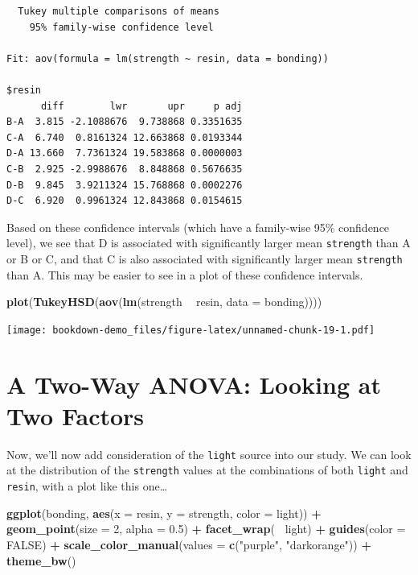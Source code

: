 \documentclass[]{book}
\newenvironment{Shaded}{\begin{snugshade}}{\end{snugshade}}
\newcommand{\KeywordTok}[1]{\textcolor[rgb]{0.13,0.29,0.53}{\textbf{#1}}}
\newcommand{\DataTypeTok}[1]{\textcolor[rgb]{0.13,0.29,0.53}{#1}}
\newcommand{\DecValTok}[1]{\textcolor[rgb]{0.00,0.00,0.81}{#1}}
\newcommand{\FloatTok}[1]{\textcolor[rgb]{0.00,0.00,0.81}{#1}}
\newcommand{\StringTok}[1]{\textcolor[rgb]{0.31,0.60,0.02}{#1}}
\newcommand{\OtherTok}[1]{\textcolor[rgb]{0.56,0.35,0.01}{#1}}
\newcommand{\OperatorTok}[1]{\textcolor[rgb]{0.81,0.36,0.00}{\textbf{#1}}}
\newcommand{\NormalTok}[1]{#1}
\theoremstyle{definition}
\theoremstyle{definition}
\theoremstyle{definition}
\theoremstyle{remark}
\begin{document}
\begin{verbatim}
  Tukey multiple comparisons of means
    95% family-wise confidence level

Fit: aov(formula = lm(strength ~ resin, data = bonding))

$resin
      diff        lwr       upr     p adj
B-A  3.815 -2.1088676  9.738868 0.3351635
C-A  6.740  0.8161324 12.663868 0.0193344
D-A 13.660  7.7361324 19.583868 0.0000003
C-B  2.925 -2.9988676  8.848868 0.5676635
D-B  9.845  3.9211324 15.768868 0.0002276
D-C  6.920  0.9961324 12.843868 0.0154615
\end{verbatim}

Based on these confidence intervals (which have a family-wise 95\%
confidence level), we see that D is associated with significantly larger
mean \texttt{strength} than A or B or C, and that C is also associated
with significantly larger mean \texttt{strength} than A. This may be
easier to see in a plot of these confidence intervals.

\begin{Shaded}
\begin{Highlighting}[]
\KeywordTok{plot}\NormalTok{(}\KeywordTok{TukeyHSD}\NormalTok{(}\KeywordTok{aov}\NormalTok{(}\KeywordTok{lm}\NormalTok{(strength }\OperatorTok{~}\StringTok{ }\NormalTok{resin, }\DataTypeTok{data =}\NormalTok{ bonding))))}
\end{Highlighting}
\end{Shaded}

\texttt{[image: bookdown-demo\_files/figure-latex/unnamed-chunk-19-1.pdf]}

\section{A Two-Way ANOVA: Looking at Two
Factors}\label{a-two-way-anova-looking-at-two-factors}

Now, we'll now add consideration of the \texttt{light} source into our
study. We can look at the distribution of the \texttt{strength} values
at the combinations of both \texttt{light} and \texttt{resin}, with a
plot like this one\ldots{}

\begin{Shaded}
\begin{Highlighting}[]
\KeywordTok{ggplot}\NormalTok{(bonding, }\KeywordTok{aes}\NormalTok{(}\DataTypeTok{x =}\NormalTok{ resin, }\DataTypeTok{y =}\NormalTok{ strength, }\DataTypeTok{color =}\NormalTok{ light)) }\OperatorTok{+}
\StringTok{    }\KeywordTok{geom_point}\NormalTok{(}\DataTypeTok{size =} \DecValTok{2}\NormalTok{, }\DataTypeTok{alpha =} \FloatTok{0.5}\NormalTok{) }\OperatorTok{+}
\StringTok{    }\KeywordTok{facet_wrap}\NormalTok{(}\OperatorTok{~}\StringTok{ }\NormalTok{light) }\OperatorTok{+}
\StringTok{    }\KeywordTok{guides}\NormalTok{(}\DataTypeTok{color =} \OtherTok{FALSE}\NormalTok{) }\OperatorTok{+}
\StringTok{    }\KeywordTok{scale_color_manual}\NormalTok{(}\DataTypeTok{values =} \KeywordTok{c}\NormalTok{(}\StringTok{"purple"}\NormalTok{, }\StringTok{"darkorange"}\NormalTok{)) }\OperatorTok{+}
\StringTok{    }\KeywordTok{theme_bw}\NormalTok{() }
\end{Highlighting}
\end{Shaded}
\end{document}
